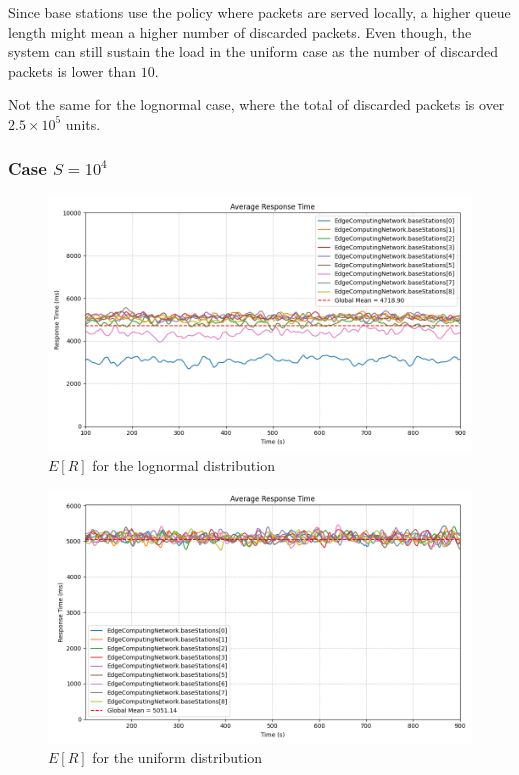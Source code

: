 \documentclass{report}
\begin{document}
Since base stations use the policy where packets are served locally, a higher queue length might mean a higher number of discarded packets. Even though, the system can still sustain the load in the uniform case as the number of discarded packets is lower than $10$.

Not the same for the lognormal case, where the total of discarded packets is over $2.5\times10^5$ units.

\vspace{10mm}

\subsubsection*{Case $S=10^4$}

\begin{figure}[H]
    \centering
    \includegraphics[width=\textwidth]{img/plots/log_1e4_A/resptime.png}
    \caption{$E[R]$ for the lognormal distribution}
\end{figure}

\begin{figure}[H]
    \centering
    \includegraphics[width=\textwidth]{img/plots/uni_1e4_A/resptime.png}
    \caption{$E[R]$ for the uniform distribution}
\end{figure}
\end{document}
